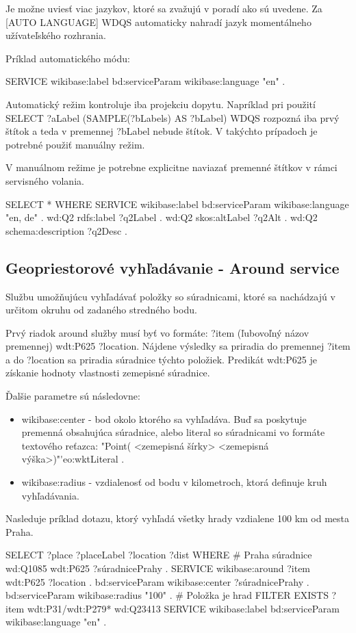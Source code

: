 Je možne uviesť viac jazykov, ktoré sa zvažujú v poradí ako sú uvedene.
Za [AUTO LANGUAGE] WDQS automaticky nahradí jazyk momentálneho užívateľského rozhrania. 

Príklad automatického módu: 
\begin{code}
    SERVICE wikibase:label {
    bd:serviceParam wikibase:language "en" .
    }
\end{code}

Automatický režim kontroluje iba projekciu dopytu. 
Napríklad pri použití SELECT ?aLabel (SAMPLE(?bLabels) AS ?bLabel) WDQS rozpozná 
iba prvý štítok a teda v premennej ?bLabel nebude štítok. 
V takýchto prípadoch je potrebné použiť manuálny režim. 

V manuálnom režime je potrebne explicitne naviazať premenné štítkov v rámci servisného volania. 
\begin{code}
    SELECT *
    WHERE {
    SERVICE wikibase:label {
    bd:serviceParam wikibase:language "en, de" .
    wd:Q2 rdfs:label ?q2Label .
    wd:Q2 skos:altLabel ?q2Alt .
    wd:Q2 schema:description ?q2Desc .
    }
    }
\end{code}

\subsection{Geopriestorové vyhľadávanie - Around service }
Službu umožňujúcu vyhľadávať položky so súradnicami, ktoré sa nachádzajú v určitom okruhu 
od zadaného stredného bodu. 

Prvý riadok around služby musí byť vo formáte: ?item (ľubovoľný názov premennej) wdt:P625 ?location. 
Nájdene výsledky sa priradia do premennej ?item a do ?location sa priradia súradnice týchto položiek. 
Predikát wdt:P625 je získanie hodnoty vlastnosti zemepisné súradnice. 

Ďalšie parametre sú následovne: 
\begin{itemize}
    \item wikibase:center - bod okolo ktorého sa vyhľadáva. Buď sa poskytuje premenná obsahujúca 
          súradnice, alebo literal so súradnicami vo formáte textového reťazca: "Point( 
          <zemepisná šírky> 
          <zemepisná výška>)"^^geo:wktLiteral . 
    \item wikibase:radius - vzdialenosť od bodu v kilometroch, ktorá definuje kruh vyhľadávania. 
\end{itemize}

Nasleduje príklad dotazu, ktorý vyhľadá všetky hrady vzdialene 100 km od mesta Praha. 
\begin{code}
    SELECT ?place ?placeLabel ?location ?dist WHERE {
    # Praha súradnice
    wd:Q1085 wdt:P625 ?súradnicePrahy .
    SERVICE wikibase:around {
    ?item wdt:P625 ?location .
    bd:serviceParam wikibase:center ?súradnicePrahy .
    bd:serviceParam wikibase:radius "100" .
    }
    # Položka je hrad
    FILTER EXISTS { ?item wdt:P31/wdt:P279* wd:Q23413 }
    SERVICE wikibase:label {
    bd:serviceParam wikibase:language "en" .
    }
    }
\end{code}

